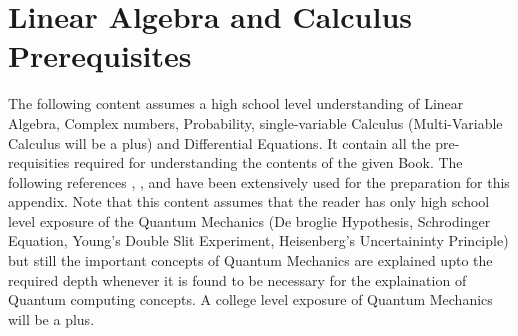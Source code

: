 \documentclass[12pt, oneside]{book}
\theoremstyle{definition}
\theoremstyle{definition}
\theoremstyle{remark}
\begin{document}

\appendix  %

\chapter{Linear Algebra and Calculus Prerequisites}
The following content assumes a high school level understanding of Linear Algebra, Complex numbers, Probability, single-variable Calculus 
(Multi-Variable Calculus will be a plus) and
Differential Equations. 
It contain all the pre-requisities required for understanding the contents of the given 
Book. The following references \cite{nielsen2001quantum}, \cite{dewolf2023quantum}, \cite{shankar2012principles}
and \cite{lin2022lecture} have been extensively used for the preparation for this appendix. 
Note that this content assumes that the reader has only high school level 
exposure of the Quantum Mechanics (De broglie Hypothesis, Schrodinger Equation, Young's Double Slit Experiment, Heisenberg's Uncertaininty Principle) but still the important concepts of Quantum Mechanics are explained 
upto the required depth whenever it
is found to be necessary for the explaination of Quantum computing concepts. A college level
exposure of Quantum Mechanics will be a plus.
\end{document}
